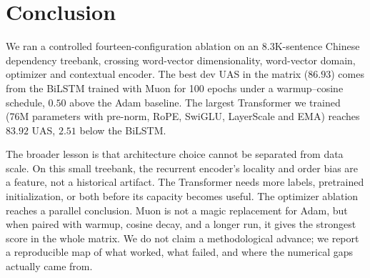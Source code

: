\section{Conclusion}
\label{sec:conclusion}

We ran a controlled fourteen-configuration ablation on an 8.3K-sentence Chinese dependency treebank, crossing word-vector dimensionality, word-vector domain, optimizer and contextual encoder. The best dev UAS in the matrix ($86.93$) comes from the BiLSTM trained with Muon for 100 epochs under a warmup--cosine schedule, $0.50$ above the Adam baseline. The largest Transformer we trained (76M parameters with pre-norm, RoPE, SwiGLU, LayerScale and EMA) reaches $83.92$ UAS, $2.51$ below the BiLSTM.

The broader lesson is that architecture choice cannot be separated from data scale. On this small treebank, the recurrent encoder's locality and order bias are a feature, not a historical artifact. The Transformer needs more labels, pretrained initialization, or both before its capacity becomes useful. The optimizer ablation reaches a parallel conclusion. Muon is not a magic replacement for Adam, but when paired with warmup, cosine decay, and a longer run, it gives the strongest score in the whole matrix. We do not claim a methodological advance; we report a reproducible map of what worked, what failed, and where the numerical gaps actually came from.
